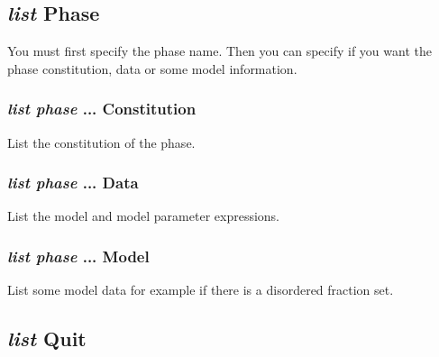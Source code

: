 \documentclass[12pt]{article}
\begin{document}
\subsection{{\em list} Phase}

You must first specify the phase name.  Then you can specify if you
want the phase constitution, data or some model information.

\subsubsection{{\em list phase} ... Constitution}

List the constitution of the phase.

\subsubsection{{\em list phase} ... Data}

List the model and model parameter expressions.

\subsubsection{{\em list phase} ... Model}

List some model data for example if there is a disordered fraction set.

\subsection{{\em list} Quit}
\end{document}
